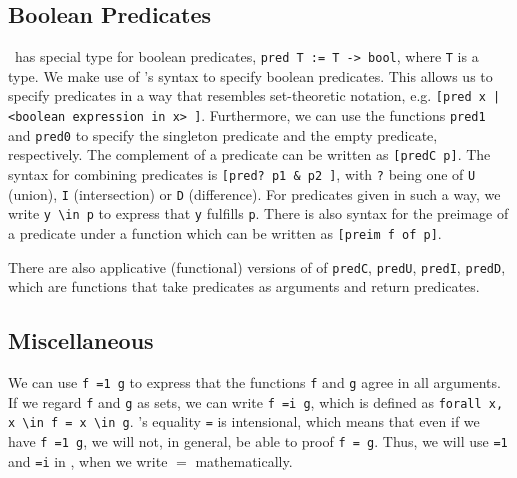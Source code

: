 \subsection{Boolean Predicates}
\ssreflect\ has special type for boolean predicates, \lstinline{pred T := T -> bool}, where \lstinline{T} is a type.
We make use of \ssreflect's syntax to specify boolean predicates.
This allows us to specify predicates in a way that resembles set-theoretic notation, e.g. 
\lstinline{[pred x | <boolean expression in x> ]}.
Furthermore, we can use the functions \lstinline{pred1} and \lstinline{pred0} to specify the singleton predicate and the empty predicate, respectively.
The complement of a predicate can be written as \lstinline{[predC p]}. 
The syntax for combining predicates is \lstinline{[pred? p1 & p2 ]}, with \lstinline{?} being one of 
\lstinline{U} (union), \lstinline{I} (intersection) or \lstinline{D} (difference).
For predicates given in such a way, we write \lstinline{y \in p} to express that \lstinline{y} fulfills \lstinline{p}.
There is also syntax for the preimage of a predicate under a function
which can be written as \lstinline{[preim f of p]}.



There are also applicative (functional) versions of of \lstinline{predC}, \lstinline{predU}, \lstinline{predI}, \lstinline{predD}, 
which are functions that take predicates as arguments and return predicates.

\subsection{Miscellaneous}
We can use \lstinline{f =1 g} to express that the functions \lstinline{f} and \lstinline{g} agree in all arguments.
If we regard \lstinline{f} and \lstinline{g} as sets, we can write \lstinline{f =i g}, which is defined as \lstinline{forall x, x \in f = x \in g}.
\coq's equality \lstinline{=} is intensional, which means that even if we have \lstinline{f =1 g}, we will not, in general, be able to proof \lstinline{f = g}.
Thus, we will use \lstinline{=1} and \lstinline{=i} in \coq, when we write $=$ mathematically. 



